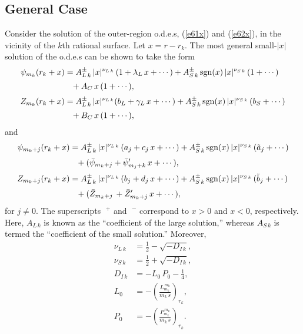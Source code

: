 \documentclass[12pt,prb,aps]{revtex4-1}
\begin{document}
\subsection{General Case}\label{sgen}
Consider the solution of the outer-region o.d.e.s, (\ref{e61x}) and (\ref{e62x}), in the
vicinity of the $k$th rational surface. Let  $x=r-r_k$.  The most general small-$|x|$ solution of the o.d.e.s
can be shown to take the form\,\cite{am1,am3}
\begin{align}
\psi_{m_k}(r_k+x)&=A_{L\,k}^\pm \,|x|^{\nu_{L\,k}}\,(1+\lambda_{L}\,x+\cdots) + A_{S\,k}^{\pm}\,{\rm sgn}(x)\,|x|^{\nu_{S\,k}}\,(1+\cdots) \nonumber\\[0.5ex]
& \phantom{=}+ A_{C}\,x\,(1+\cdots),\label{ex1}\\[0.5ex]
Z_{m_k}(r_k+x)&= A_{L\,k}^\pm\,|x|^{\nu_{L\,k}}(b_{L}  + \gamma_{L}\,x+\cdots) + A_{S\,k}^{\pm}\,{\rm sgn}(x)\,|x|^{\nu_{S\,k}}\,(b_{S}+\cdots)\nonumber\\[0.5ex]
& \phantom{=}+ B_{C}\,x\,(1+\cdots),\label{ex2}
\end{align}
and 
\begin{align}
\psi_{m_k+j}(r_k+x)&=A_{L\,k}^\pm\,|x|^{\nu_{L\,k}}\,(a_j+c_j\,x+\cdots)  
+A_{S\,k}^\pm\,{\rm sgn}(x)\,|x|^{\nu_{S\,k}}\,(\tilde{a}_{j}+\cdots)\nonumber\\[0.5ex]
&\phantom{=}+ (\bar{\psi}_{m_k+j}+\bar{\psi}_{m_j+k}'\,x+\cdots),\\[0.5ex]
Z_{m_k+j}(r_k+x)&= A_{L\,k}^\pm\,|x|^{\nu_{L\,k}}\,(b_j+d_j\,x+\cdots) +A_{S\,k}^\pm\,{\rm sgn}(x)\,|x|^{\nu_{S\,k}}\,(\tilde{b}_{j}+\cdots)\nonumber\\[0.5ex]
&\phantom{=}+(\bar{Z}_{m_k+j}\,+\bar{Z}_{m_k+j}'\,x+\cdots),\label{ex4}
\end{align}
for $j\neq 0$. 
The superscripts $\phantom{!}^+$ and $\phantom{!}^-$ correspond  to $x>0$ and $x<0$, respectively. Here, $A_{L\,k}$ is known as the ``coefficient of
the large solution,'' whereas $A_{S\,k}$ is termed the ``coefficient of the small solution.''\cite{am1,am3,ggj}
Moreover, 
\begin{align}
\nu_{L\,k}&= \frac{1}{2}-\sqrt{-D_{I\,k}},\label{nul}\\[0.5ex]
\nu_{S\,k} &=  \frac{1}{2}+\sqrt{-D_{I\,k}},\label{nus}\\[0.5ex]
D_{I\,k} &= -L_0\,P_0-\frac{1}{4},\\[0.5ex]
L_0 &=-\left(\frac{L_{m_k}^{\,m_k}}{m_k\,s}\right)_{r_k},\label{lkk}\\[0.5ex]
P_0 &= -\left(\frac{P_{m_k}^{\,m_k}}{m_k\,s}\right)_{r_k}.\label{pkk}
\end{align}
\end{document}
